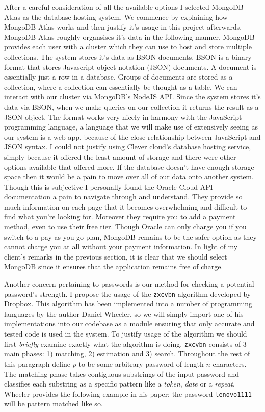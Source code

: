 After a careful consideration of all the available options 
I selected MongoDB Atlas as the database hosting system. We 
commence by explaining how MongoDB Atlas works and then 
justify it's usage in this project afterwards. MongoDB Atlas
roughly organsises it's data in the following manner. MongoDB
provides each user with a cluster which they can use to host
and store multiple collections. The system stores it's data
as BSON documents. BSON is a binary format that stores
Javascript object notation (JSON) documents. A document is 
essentially just a row in a database. Groups of documents 
are stored as a collection, where a collection can 
essentially be thought as a table. We can interact with our
cluster via MongoDB's NodeJS API. Since the system stores
it's data via BSON, when we make queries on our collection it
returns the result as a JSON object. The format works very 
nicely in harmony with the JavaScript programming language, 
a language that we will make use of extensively seeing as our
system is a web-app, because of the close relationship
between JavaScript and JSON syntax. I could not justify using 
Clever cloud's database hosting service, simply because it 
offered the least amount of storage and there were other 
options available that offered more. If the database doesn't 
have enough storage space then it would be a pain to move over
all of our data onto another system. Though this is subjective
I personally found the Oracle Cloud API documentation a pain 
to navigate through and understand. They provide so much 
information on each page that it becomes overwhelming and 
difficult to find what you're looking for. Moreover they 
require you to add a payment method, even to use their free 
tier. Though Oracle can only charge you if you switch to a 
pay as you go plan, MongoDB remains to be the safer option
as they cannot charge you at all without your payment 
information. In light of my client's remarks in the previous
section, it is clear that we should select MongoDB since 
it ensures that the application remains free of charge.
\\ \vspace{0.2cm}

Another concern pertaining to passwords is our method for 
checking a potential password's strength. I propose the usage
of the \texttt{zxcvbn} algorithm \cite{pass} developed by
Dropbox. This algorithm has been implemented into a number of
programming languages by the author Daniel Wheeler, so we will
simply import one of his implementations into our codebase as
a module ensuring that only accurate and tested code is used 
in the system. To justify usage of the algorithm we should
first \textit{briefly} examine exactly what the algorithm is
doing. \texttt{zxcvbn} consists of 3 main phases: 1) matching,
2) estimation and 3) search. Throughout the rest of this
paragraph define $p$ to be some arbitrary password of length
$n$ characters. The matching phase takes contiguous
substrings of the input password and classifies
each substring as a specific pattern like a \textit{token},
\textit{date} or a \textit{repeat}. Wheeler provides the
following example in his paper; the password
\texttt{lenovo1111} will be pattern matched like so.

